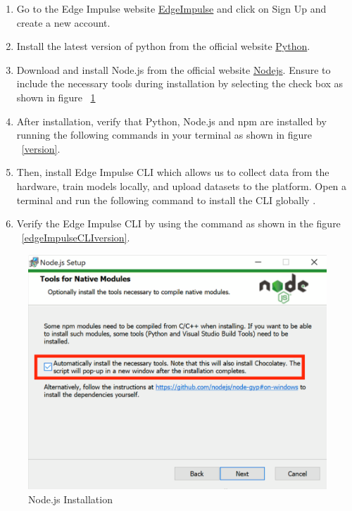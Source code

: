 \begin{enumerate}
	\item Go to the Edge Impulse website \href{https://www.edgeimpulse.com.}{EdgeImpulse} and click on Sign Up and create a new account.
	\item Install the latest version of python from the official website \href{https://www.python.org/}{Python}.
	\item Download and install Node.js from the official website \href{https://nodejs.org/en/}{Nodejs}. Ensure to include the necessary tools during installation by selecting the check box as shown in figure ~\ref{NodejsInstallation}
	\item After installation, verify that Python, Node.js and npm are installed by running the following commands in your terminal  as shown in figure ~\ref{version}.
	\item Then, install Edge Impulse CLI which allows us to collect data from the hardware, train models locally, and upload datasets to the platform. Open a terminal and run the following command to install the CLI globally .
	\item Verify the Edge Impulse CLI by using the command  as shown in the figure ~\ref{edgeImpulseCLIversion}.
\end{enumerate}
\begin{figure}
	\begin{center}
		\includegraphics[width=0.7\linewidth]{Images/EdgeImpulse/Nodejs.png}
		\caption{Node.js Installation}
		\label{NodejsInstallation}
	\end{center}
\end{figure}

